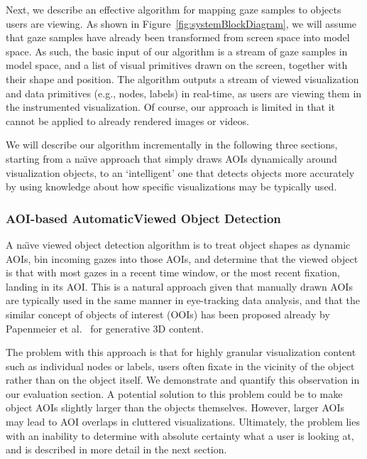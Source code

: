 Next, we describe an effective algorithm for mapping gaze samples to objects users are viewing. As shown in Figure~\ref{fig:systemBlockDiagram}, we will assume that gaze samples have already been transformed from screen space into model space. As such, the basic input of our algorithm is a stream of gaze samples in model space, and a list of visual primitives drawn on the screen, together with their shape and position. The algorithm outputs a stream of viewed visualization and data primitives (e.g., nodes, labels) in real-time, as users are viewing them in the instrumented visualization. Of course, our approach is limited in that it cannot be applied to already rendered images or videos. 

We will describe our algorithm incrementally in the following three sections, starting from a na\"{\i}ve approach that simply draws AOIs dynamically around visualization objects, to an `intelligent' one that detects objects more accurately by using knowledge about how specific visualizations may be typically used.  

\subsubsection{AOI-based AutomaticViewed Object Detection}
A na\"{\i}ve viewed object detection algorithm is to treat object shapes as dynamic AOIs, bin incoming gazes into those AOIs, and determine that the viewed object is that with most gazes in a recent time window, or the most recent fixation, landing in its AOI. This is a natural approach given that manually drawn AOIs are typically used in the same manner in eye-tracking data analysis, and that the similar concept of objects of interest (OOIs) has been proposed already by Papenmeier et al.~\cite{papenmeier2010dynaoi} for generative 3D content.

The problem with this approach is that for highly granular visualization content such as individual nodes or labels, users often fixate in the vicinity of the object rather than on the object itself. We demonstrate and quantify this observation in our evaluation section. A potential solution to this problem could be to make object AOIs slightly larger than the objects themselves. However, larger AOIs may lead to AOI overlaps in cluttered visualizations. Ultimately, the problem lies with an inability to determine with absolute certainty what a user is looking at, and is described in more detail in the next section.


